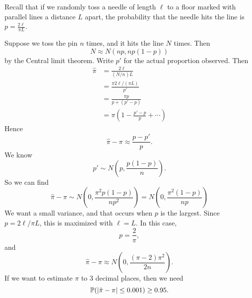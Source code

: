 \begin{note}
  \begin{field}
    \begin{eg}
      Recall that if we randomly toss a needle of length $\ell$ to a floor marked with parallel lines a distance $L$ apart, the probability that the needle hits the line is $p = \frac{2\ell}{\pi L}$.
      \begin{center}
      \end{center}
      Suppose we toss the pin $n$ times, and it hits the line $N$ times. Then
      \[
        N\approx N(np, np(1 - p))
      \]
      by the Central limit theorem. Write $p'$ for the actual proportion observed. Then
      \begin{align*}
        \hat{\pi} &= \frac{2\ell}{(N/n) L} \\
        &= \frac{\pi 2\ell/(\pi L)}{p'}\\
        &= \frac{\pi p}{p + (p' - p)}\\
        &= \pi \left(1 - \frac{p' - p}{p} + \cdots \right)
      \end{align*}
      Hence
      \[
        \hat\pi - \pi \approx \frac{p - p'}{p}.
      \]
      We know
      \[
        p' \sim N\left(p, \frac{p(1 - p)}{n}\right).
      \]
      So we can find
      \[
        \hat \pi - \pi \sim N\left(0, \frac{\pi^2 p(1 - p)}{np^2}\right) = N\left(0, \frac{\pi^2(1 - p)}{np}\right)
      \]
      We want a small variance, and that occurs when $p$ is the largest. Since $p = 2\ell/\pi L$, this is maximized with $\ell = L$. In this case,
      \[
        p = \frac{2}{\pi},
      \]
      and
      \[
        \hat \pi - \pi \approx N\left(0, \frac{(\pi - 2)\pi^2}{2n}\right).
      \]
      If we want to estimate $\pi$ to 3 decimal places, then we need
      \[
        \P(|\hat \pi - \pi| \leq 0.001) \geq 0.95.
\]
\end{eg}
\end{field}
\end{note}
